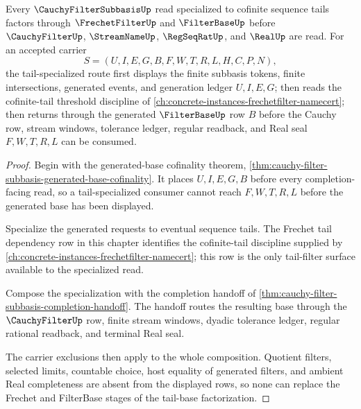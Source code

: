\begin{theorem}
\label{thm:cauchy-filter-subbasis-tail-base-factorization}
Every $\CauchyFilterSubbasisUp$ read specialized to cofinite sequence tails factors through $\FrechetFilterUp$ and $\FilterBaseUp$ before $\CauchyFilterUp$, $\StreamNameUp$, $\RegSeqRatUp$, and $\RealUp$ are read. For an accepted carrier
$$
S=(U,I,E,G,B,F,W,T,R,L,H,C,P,N),
$$
the tail-specialized route first displays the finite subbasis tokens, finite intersections, generated events, and generation ledger $U,I,E,G$; then reads the cofinite-tail threshold discipline of \autoref{ch:concrete-instances-frechetfilter-namecert}; then returns through the generated $\FilterBaseUp$ row $B$ before the Cauchy row, stream windows, tolerance ledger, regular readback, and Real seal $F,W,T,R,L$ can be consumed.
\end{theorem}
\begin{proof}
Begin with the generated-base cofinality theorem, \autoref{thm:cauchy-filter-subbasis-generated-base-cofinality}. It places $U,I,E,G,B$ before every completion-facing read, so a tail-specialized consumer cannot reach $F,W,T,R,L$ before the generated base has been displayed.

Specialize the generated requests to eventual sequence tails. The Frechet tail dependency row in this chapter identifies the cofinite-tail discipline supplied by \autoref{ch:concrete-instances-frechetfilter-namecert}; this row is the only tail-filter surface available to the specialized read.

Compose the specialization with the completion handoff of \autoref{thm:cauchy-filter-subbasis-completion-handoff}. The handoff routes the resulting base through the $\CauchyFilterUp$ row, finite stream windows, dyadic tolerance ledger, regular rational readback, and terminal Real seal.

The carrier exclusions then apply to the whole composition. Quotient filters, selected limits, countable choice, host equality of generated filters, and ambient Real completeness are absent from the displayed rows, so none can replace the Frechet and FilterBase stages of the tail-base factorization.
\end{proof}
